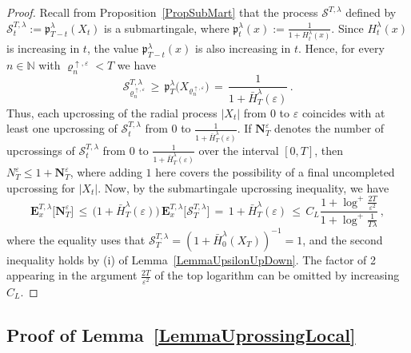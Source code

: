 \documentclass[10pt]{article}
\numberwithin{equation}{section}
\theoremstyle{definition}
\begin{document}
\begin{proof} Recall from Proposition~\ref{PropSubMart} that the process $\mathcal{S}^{T,\lambda}$  defined by $\mathcal{S}_{t}^{T,\lambda}:=\mathfrak{p}_{T-t}^{\lambda}(X_t)$ is a submartingale, where  $\mathfrak{p}_{t}^{\lambda}(x):=\frac{  1}{1+H_{t}^{\lambda}(x)   }$.  Since $H_{t}^{\lambda}(x)$ is increasing in $t$, the value $\mathfrak{p}_{T-t}^{\lambda}(x)$ is also increasing in $t$. Hence, for every $n\in \mathbb{N}$ with $\varrho_{n}^{\uparrow ,\varepsilon}<T$ we have
$$ \mathcal{S}_{\varrho_{n}^{\uparrow,\varepsilon}}^{T,\lambda} \,\geq \,  \mathfrak{p}_{T}^{\lambda}\big(X_{ \varrho_{n}^{\uparrow ,\varepsilon} }\big)   \,=\,\frac{  1}{1+\bar{H}_{T}^{\lambda}(\varepsilon)   } \,.  $$
 Thus, each upcrossing of the radial process $|X_t|$ from $0$ to $\varepsilon$ coincides with at least one upcrossing of  $\mathcal{S}_{t}^{T,\lambda}$ from $0$ to $\frac{  1}{1+\bar{H}_{T}^{\lambda}(\varepsilon)   } $.  If $ \mathbf{N}_{T}^{\varepsilon}$ denotes the number of  upcrossings of $\mathcal{S}_{t}^{T,\lambda}$ from $0$ to $\frac{  1}{1+\bar{H}_{T}^{\lambda}(\varepsilon)   }$ over the interval $[0,T]$, then  $N_{T}^{\varepsilon}\leq 1+\mathbf{N}_{T}^{\varepsilon} $, where adding $1$ here covers the possibility of a final uncompleted upcrossing for $|X_t|$.  Now, by the submartingale upcrossing inequality, we have
$$     \mathbf{E}^{T,\lambda}_{x}\big[ \mathbf{N}_{T}^{\varepsilon}\big] \,\leq \, \big(  1+\bar{H}_{T}^{\lambda}(\varepsilon)  \big)\,\mathbf{E}^{T,\lambda}_{x}\Big[\mathcal{S}_{T}^{T,\lambda}\Big] \,= \,   1+\bar{H}_{T}^{\lambda}(\varepsilon) \,\leq \, C_L \frac{ 1+\log^+\frac{2T}{\varepsilon^2 }  }{1+\log^+\frac{1}{T\lambda} }   \,, $$
where the  equality uses that  $\mathcal{S}_{T}^{T,\lambda}= (1+\bar{H}_{0}^{\lambda}(X_T))^{-1} =1$, and the second inequality holds by (i) of Lemma~\ref{LemmaUpsilonUpDown}.  The factor of 2 appearing in the argument $\frac{2T}{\varepsilon^2}$ of the top logarithm can be omitted by increasing $C_L$.
\end{proof}


\subsection{Proof of Lemma~\ref{LemmaUprossingLocal}} \label{SubsectionLemmaUprossingLocal}
\end{document}

